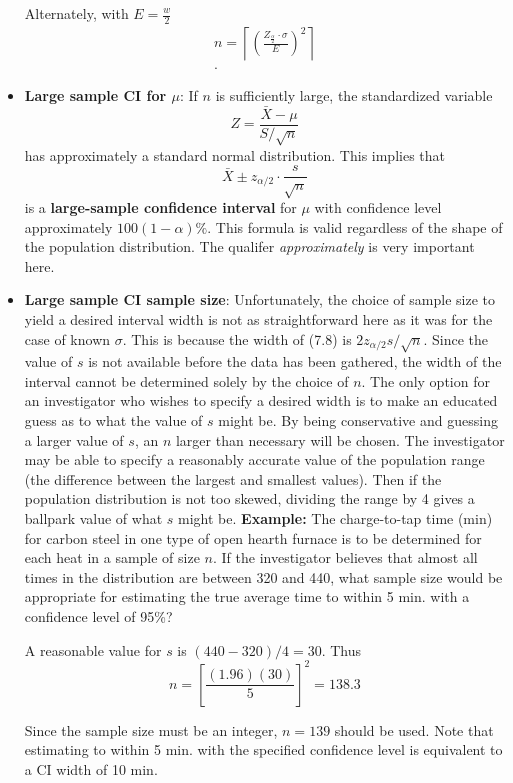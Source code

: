 \documentclass{report}
\begin{document}
\begin{itemize}
            \bigbreak \noindent 
            Alternately, with $E=\frac{w}{2} $
            \begin{align*}
                n = \left\lceil\left(\frac{Z_{\frac{\alpha}{2}} \cdot \sigma}{E}\right)^{2} \right\rceil \\
            .\end{align*}
        \item \textbf{Large sample CI for $\mu$}:
            If \( n \) is sufficiently large, the standardized variable
            \[
                Z = \frac{\bar{X} - \mu}{S/\sqrt{n}}
            \]
            has approximately a standard normal distribution. This implies that
            \[
                \bar{X} \pm z_{\alpha/2} \cdot \frac{s}{\sqrt{n}}
            \]
            is a \textbf{large-sample confidence interval} for \( \mu \) with confidence level approximately \( 100(1 - \alpha)\% \). This formula is valid regardless of the shape of the population distribution.
            \bigbreak \noindent 
            The qualifer \textit{approximately} is very important here.
        \item \textbf{Large sample CI sample size}:
            Unfortunately, the choice of sample size to yield a desired interval width is not
            as straightforward here as it was for the case of known \(\sigma\). This is because the width
            of (7.8) is \(2z_{\alpha/2}s/\sqrt{n}\). Since the value of \(s\) is not available before the data has been
            gathered, the width of the interval cannot be determined solely by the choice of \(n\). The
            only option for an investigator who wishes to specify a desired width is to make an
            educated guess as to what the value of \(s\) might be. By being conservative and guessing
            a larger value of \(s\), an \(n\) larger than necessary will be chosen. The investigator may
            be able to specify a reasonably accurate value of the population range (the difference
            between the largest and smallest values). Then if the population distribution is not too
            skewed, dividing the range by 4 gives a ballpark value of what \(s\) might be.
            \bigbreak \noindent 
            \textbf{Example:}
            The charge-to-tap time (min) for carbon steel in one type of open hearth furnace is
            to be determined for each heat in a sample of size \(n\). If the investigator believes that
            almost all times in the distribution are between 320 and 440, what sample size would
            be appropriate for estimating the true average time to within 5 min. with a confidence level of 95\%?
            \par
            A reasonable value for \(s\) is \((440 - 320)/4 = 30\). Thus
            \[
                n = \left[ \frac{(1.96)(30)}{5} \right]^2 = 138.3
            \]
            \par
            Since the sample size must be an integer, \(n = 139\) should be used. Note that estimating to within 5 min. with the specified confidence level is equivalent to a CI width of 10 min.


\end{itemize}
\end{document}
